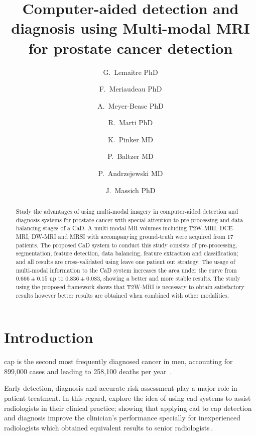 \documentclass[num-refs]{wiley-article}
\title{Computer-aided detection and diagnosis using Multi-modal MRI for prostate cancer detection}
\author[1\authfn{1}]{G.~Lemaitre PhD}
\author[2\authfn{1}]{F.~Meriaudeau PhD}
\author[2\authfn{1}]{A.~Meyer-Bease PhD}
\author[2\authfn{1}]{R.~Marti PhD}
\author[2\authfn{1}]{K.~Pinker MD}
\author[2\authfn{1}]{P.~Baltzer MD}
\author[2\authfn{1}]{P.~Andrzejewski MD}
\author[1\authfn{1}]{J.~Massich PhD}
\affil[1]{Department, Institution, City, State or Province, Postal Code, Country}
\affil[2]{Department, Institution, City, State or Province, Postal Code, Country}
\begin{document}
\maketitle


\begin{abstract}
    Study the advantages of using multi-modal imagery in computer-aided
    detection and diagnosis systems for prostate cancer with special attention to
    pre-processing and data-balancing stages of a CaD.
%
    A multi modal MR volumes including T2W-MRI, DCE-MRI, DW-MRI and MRSI with
    accompanying ground-truth were acquired from 17 patients. The proposed CaD
    system to conduct this study consists of pre-processing, segmentation, feature
    detection, data balancing, feature extraction and classification;
    and all results are cross-validated using leave one patient out strategy.
%
    The usage of multi-modal information to the CaD system increases the area
    under the curve from $0.666\pm0.15$ up to $0.836\pm0.083$, showing a better
    and more stable results.
%
    The study using the proposed framework shows that T2W-MRI is necessary to
    obtain satisfactory results however better results are obtained when combined
    with other modalities.

\end{abstract}




\section{Introduction}

\Ac{cap} is the second most frequently diagnosed cancer in men, accounting for
899,000 cases and leading to 258,100 deaths per year~\citep{ferlay2010estimates}.

Early detection, diagnosis and accurate risk assessment play a major role in
patient treatment. In this regard, \citeauthor*{Hambrock2013} explore the idea
of using \ac{cad} systems to assist radiologists in their clinical practice;
showing that applying \ac{cad} to \ac{cap} detection and diagnosis improve the
clinician's performance specially for inexperienced radiologists which obtained
equivalent results to senior radiologists\,\cite{Hambrock2013}.
\end{document}
